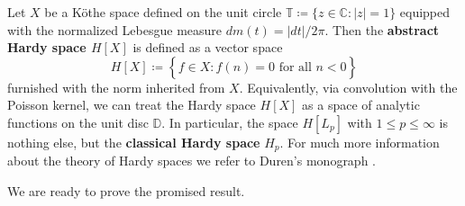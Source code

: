 \documentclass[11pt]{amsart}
\theoremstyle{definition}
\theoremstyle{definition}
\theoremstyle{definition}
\theoremstyle{definition}
\theoremstyle{definition}
\theoremstyle{definition}
\theoremstyle{definition}
\theoremstyle{definition}
\numberwithin{equation}{section}
\numberwithin{equation}{section}
\numberwithin{equation}{section}
\theoremstyle{definition}
\theoremstyle{definition}
\theoremstyle{definition}
\theoremstyle{definition}
\theoremstyle{definition}
\theoremstyle{definition}
\newcommand{\abs}[1]{\left\lvert#1\right\rvert}
\begin{document}
Let $X$ be a K{\" o}the space defined on the unit circle $\mathbb{T} \coloneqq \{z \in \mathbb{C} \colon \abs{z} = 1\}$
equipped with the normalized Lebesgue measure $dm(t) = \abs{dt}/2\pi$.
Then the {\bf abstract Hardy space $H[X]$} is defined as a vector space
\begin{equation*}
	H[X] \coloneqq \left\{ f \in X \colon \widehat{f}(n) = 0 \text{ for all } n < 0 \right\}
\end{equation*}
furnished with the norm inherited from $X$. Equivalently, via convolution with the Poisson kernel, we can treat the Hardy space $H[X]$
as a space of analytic functions on the unit disc $\mathbb{D}$. In particular, the space $H[L_p]$ with $1 \leqslant p \leqslant \infty$
is nothing else, but the {\bf classical Hardy space} $H_p$. For much more information about the theory of Hardy spaces we refer to Duren's monograph \cite{Dur76}.

We are ready to prove the promised result.
\end{document}
